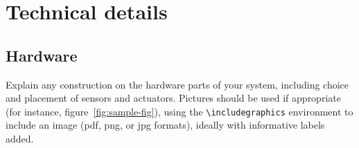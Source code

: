 \documentclass{article}
\begin{document}




\section{Technical details}




\subsection{Hardware}

Explain any construction on the hardware parts of your system, including choice and placement of sensors and actuators. Pictures should be used if appropriate (for instance, figure~\ref{fig:sample-fig}), using the \verb+\includegraphics+ environment to include an image (pdf, png, or jpg formats), ideally with informative labels added. 
\end{document}
